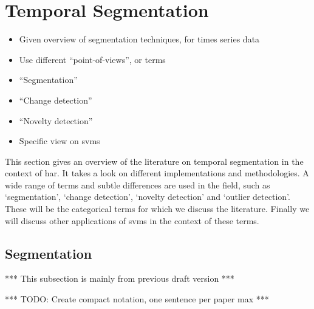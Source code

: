 \section{Temporal Segmentation}\label{sec:temporal_segmentation}

\begin{itemize}
  \item Given overview of segmentation techniques, for times series data
  \item Use different ``point-of-views'', or terms
  \item ``Segmentation''
  \item ``Change detection''
  \item ``Novelty detection''
  \item Specific view on \glspl{svm}
\end{itemize}

This section gives an overview of the literature on temporal segmentation in the context of \gls{har}.
It takes a look on different implementations and methodologies.
A wide range of terms and subtle differences are used in the field, such as `segmentation', `change detection', `novelty detection' and `outlier detection'.
These will be the categorical terms for which we discuss the literature.
Finally we will discuss other applications of \glspl{svm} in the context of these terms.

\subsection{Segmentation}\label{subsec:segmentation}
*** This subsection is mainly from previous draft version ***

*** TODO: Create compact notation, one sentence per paper max ***


